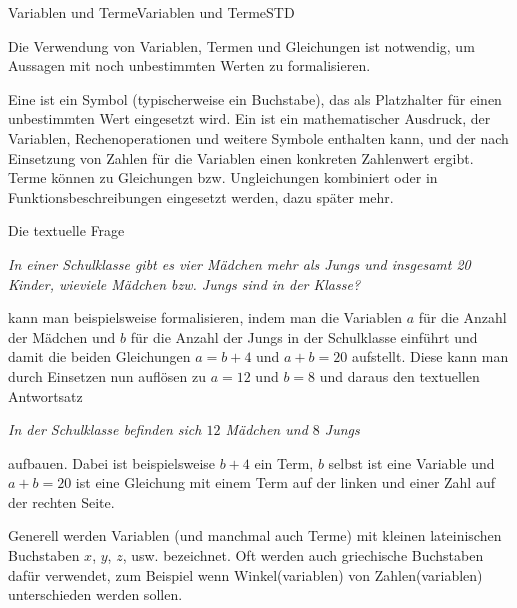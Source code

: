 \begin{MXContent}{Variablen und Terme}{Variablen und Terme}{STD}

Die Verwendung von Variablen, Termen und Gleichungen ist notwendig, um Aussagen mit noch unbestimmten Werten zu formalisieren.

\begin{MInfo}
Eine  ist ein Symbol (typischerweise ein Buchstabe), das als Platzhalter für einen unbestimmten Wert
eingesetzt wird. Ein  ist ein mathematischer Ausdruck, der Variablen, Rechenoperationen und weitere Symbole enthalten kann,
und der nach Einsetzung von Zahlen für die Variablen einen konkreten Zahlenwert ergibt. Terme können zu Gleichungen bzw. Ungleichungen
kombiniert oder in Funktionsbeschreibungen eingesetzt werden, dazu später mehr.
\end{MInfo}


\begin{MExample}
Die textuelle Frage

\textit{In einer Schulklasse gibt es vier Mädchen mehr als Jungs und insgesamt 20 Kinder, wieviele Mädchen bzw. Jungs sind in der Klasse?}

kann man beispielsweise formalisieren, indem man die Variablen $a$ für die Anzahl der Mädchen und
$b$ für die Anzahl der Jungs in der Schulklasse einführt und damit die beiden Gleichungen
$a=b+4$ und $a+b=20$ aufstellt. Diese kann man durch Einsetzen nun auflösen zu $a=12$ und $b=8$
und daraus den textuellen Antwortsatz

\textit{In der Schulklasse befinden sich $12$ Mädchen und $8$ Jungs}

aufbauen. Dabei ist beispielsweise $b+4$ ein Term, $b$ selbst ist eine Variable und $a+b=20$ ist eine Gleichung mit einem Term auf
der linken und einer Zahl auf der rechten Seite.
\end{MExample}

Generell werden Variablen (und manchmal auch Terme) mit kleinen lateinischen Buchstaben $x$, $y$, $z$, usw. bezeichnet. Oft werden auch griechische Buchstaben %
dafür verwendet, zum Beispiel wenn Winkel(variablen) von Zahlen(variablen) unterschieden werden sollen. %


\end{MXContent}
